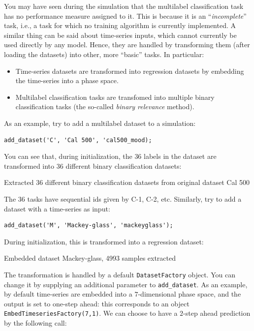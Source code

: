 You may have seen during the simulation that the multilabel classification task has no performance measure assigned to it. This is because it is an ``\textit{incomplete}'' task, i.e., a task for which no training algorithm is currently implemented. A similar thing can be said about time-series inputs, which cannot currently be used directly by any model. Hence, they are handled by transforming them (after loading the datasets) into other, more ``basic'' tasks. In particular:

\begin{itemize}
\item Time-series datasets are transformed into regression datasets by embedding the time-series into a phase space.
\item Multilabel classification tasks are transfomed into multiple binary classification tasks (the so-called \textit{binary relevance} method).
\end{itemize}

As an example, try to add a multilabel dataset to a simulation:

\begin{lstlisting}
add_dataset('C', 'Cal 500', 'cal500_mood);
\end{lstlisting}

\noindent You can see that, during initialization, the $36$ labels in the dataset are transformed into $36$ different binary classification datasets:

\begin{console}
Extracted 36 different binary classification datasets from original
  dataset Cal 500
\end{console}

\noindent The $36$ tasks have sequential ids given by C-1, C-2, etc. Similarly, try to add a dataset with a time-series as input:

\begin{lstlisting}
add_dataset('M', 'Mackey-glass', 'mackeyglass');
\end{lstlisting}

\noindent During initialization, this is transformed into a regression dataset:

\begin{console}
Embedded dataset Mackey-glass, 4993 samples extracted
\end{console}

The transformation is handled by a default \verb|DatasetFactory| object. You can change it by supplying an additional parameter to \verb|add_dataset|. As an example, by default time-series are embedded into a $7$-dimensional phase space, and the output is set to one-step ahead: this corresponds to an object \verb|EmbedTimeseriesFactory(7,1)|. We can choose to have a $2$-step ahead prediction by the following call:

